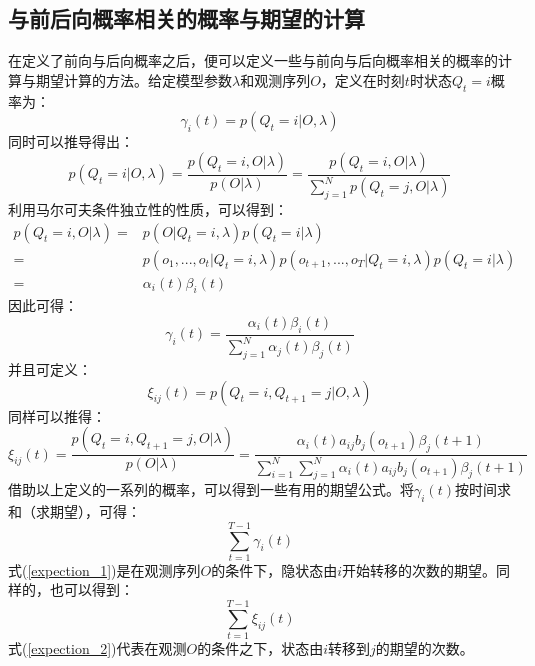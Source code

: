 \documentclass[UTF8, 12pt]{ctexart}
\begin{document}
	\subsection{与前后向概率相关的概率与期望的计算}
	在定义了前向与后向概率之后，便可以定义一些与前向与后向概率相关的概率的计算与期望计算的方法。给定模型参数$\lambda$和观测序列$O$，定义在时刻$t$时状态$Q_{t}=i$概率为：
	\begin{equation}
		\gamma_{i}(t) = p(Q_{t}=i|O, \lambda)
	\end{equation}
	同时可以推导得出：
	\begin{equation}
		p(Q_{t}=i|O,\lambda) = \frac{p(Q_{t}=i, O|\lambda)}{p(O|\lambda)} = \frac{p(Q_{t}=i, O|\lambda)}{\sum \limits_{j=1}^{N}p(Q_{t}=j, O|\lambda)}
	\end{equation}
	利用马尔可夫条件独立性的性质，可以得到：
	\begin{align}
		p(Q_{t}=i, O|\lambda) = {} & p(O|Q_{t}=i, \lambda)p(Q_{t}=i | \lambda) \\
		= {} & p(o_{1}, ..., o_{t}|Q_{t}=i, \lambda)p(o_{t+1}, ..., o_{T}|Q_{t}=i, \lambda)p(Q_{t}=i|\lambda) \\
		= {} & \alpha_{i}(t)\beta_{i}(t)
	\end{align}
	因此可得：
	\begin{equation}
		\gamma_{i}(t) = \frac{\alpha_{i}(t)\beta_{i}(t)}{\sum \limits_{j=1}^{N} \alpha_{j}(t)\beta_{j}(t)}
	\end{equation}
	并且可定义：
	\begin{equation}
		\xi_{ij}(t) = p(Q_{t}=i, Q_{t+1}=j|O, \lambda)
	\end{equation}
	同样可以推得：
	\begin{equation}
		\xi_{ij}(t) = \frac{p(Q_{t}=i, Q_{t+1}=j, O|\lambda)}{p(O|\lambda)}
		= \frac{\alpha_{i}(t)a_{ij}b_{j}(o_{t+1})\beta_{j}(t+1)} {\sum \limits_{i=1}^{N} {\sum \limits_{j=1}^{N} {\alpha_{i}(t)a_{ij}b_{j}(o_{t+1})\beta_{j}(t+1)}}}
	\end{equation}
	借助以上定义的一系列的概率，可以得到一些有用的期望公式。将$\gamma_{i}(t)$按时间求和（求期望），可得：
	\begin{equation}
		\label{expection_1}
		\sum \limits_{t=1}^{T-1} \gamma_{i}(t)
	\end{equation}
	式(\ref{expection_1})是在观测序列$O$的条件下，隐状态由$i$开始转移的次数的期望。同样的，也可以得到：
	\begin{equation}
		\label{expection_2}
		\sum \limits_{t=1}^{T-1} {\xi_{ij}(t)}
	\end{equation}
	式(\ref{expection_2})代表在观测$O$的条件之下，状态由$i$转移到$j$的期望的次数。
	
\end{document}
